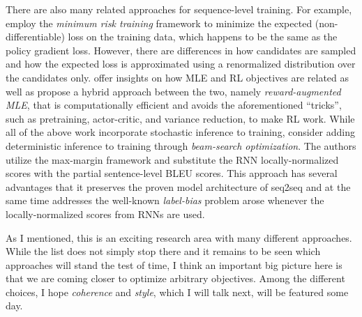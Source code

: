 There are also many related approaches for sequence-level training. For example, 
 employ the {\it minimum risk training} framework to minimize the expected (non-differentiable) loss on the training data, which happens to be the same as the policy gradient loss. However, there are differences in how candidates are sampled and how the expected loss is approximated using a renormalized distribution over the candidates only. 
 offer insights on how MLE and RL objectives are related as well as propose a hybrid approach between the two, namely {\it 
reward-augmented MLE}, that is computationally efficient and avoids the aforementioned ``tricks'', such as pretraining, actor-critic, and variance reduction, to make RL work.
While all of the above work incorporate stochastic inference to training,  consider adding deterministic inference to training through {\it beam-search optimization}.
The authors utilize the max-margin framework and substitute the RNN locally-normalized scores with the partial sentence-level BLEU scores. This approach has several advantages that it preserves the proven model architecture of seq2seq and at the same time addresses
the well-known {\it label-bias} problem \cite{lafferty01} arose whenever the locally-normalized scores from RNNs are used.

As I mentioned, this is an exciting research area with many different approaches. While the list does not simply stop there and it remains to be seen which approaches will stand the test of time, I think an important big picture here is that we are coming closer to optimize arbitrary objectives. Among the different choices, I hope {\it coherence} and {\it style}, which I will talk next, will be featured some day.

%
%
%
%
%
%
%
%
%
%


